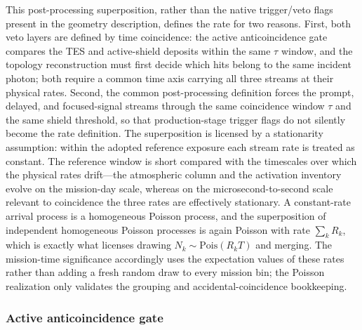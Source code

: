 \documentclass[11pt]{article}
\begin{document}
This post-processing superposition, rather than the native trigger/veto flags
present in the geometry description, defines the rate for two reasons. First,
both veto layers are defined by time coincidence: the active anticoincidence
gate compares the TES and active-shield deposits within the same $\tau$ window,
and the topology reconstruction must first decide which hits belong to the same
incident photon; both require a common time axis carrying all three streams at
their physical rates. Second, the common post-processing definition forces the
prompt, delayed, and focused-signal streams through the same coincidence window
$\tau$ and the same shield threshold, so that production-stage trigger flags do
not silently become the rate definition. The superposition is licensed by a
stationarity assumption: within the adopted reference exposure each stream rate
is treated as constant. The reference window is short compared with the
timescales over which the physical rates drift---the atmospheric column and the
activation inventory evolve on the mission-day scale, whereas on the
microsecond-to-second scale relevant to coincidence the three rates are
effectively stationary. A constant-rate arrival process is a homogeneous Poisson
process, and the superposition of independent homogeneous Poisson processes is
again Poisson with rate $\sum_k R_k$, which is exactly what licenses drawing
$N_k\sim\mathrm{Pois}(R_k T)$ and merging. The mission-time significance accordingly uses the expectation values of
these rates rather than adding a fresh random draw to every mission bin; the
Poisson realization only validates the grouping and accidental-coincidence
bookkeeping.

\subsubsection{Active anticoincidence gate}
\end{document}
